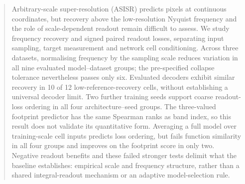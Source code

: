 \begin{abstract}
Arbitrary-scale super-resolution (ASISR) predicts pixels at continuous coordinates, but recovery above the low-resolution Nyquist frequency and the role of scale-dependent readout remain difficult to assess. We study frequency recovery and signed paired readout losses, separating input sampling, target measurement and network cell conditioning. Across three datasets, normalising frequency by the sampling scale reduces variation in all nine evaluated model--dataset groups; the pre-specified collapse tolerance nevertheless passes only six. Evaluated decoders exhibit similar recovery in 10 of 12 low-reference-recovery cells, without establishing a universal decoder limit. Two further training seeds support coarse readout-loss ordering in all four architecture--seed groups. The three-valued footprint predictor has the same Spearman ranks as band index, so this result does not validate its quantitative form. Averaging a full model over training-scale cell inputs predicts loss ordering, but fails function similarity in all four groups and improves on the footprint score in only two. Negative readout benefits and these failed stronger tests delimit what the baseline establishes: empirical scale and frequency structure, rather than a shared integral-readout mechanism or an adaptive model-selection rule.
\end{abstract}
